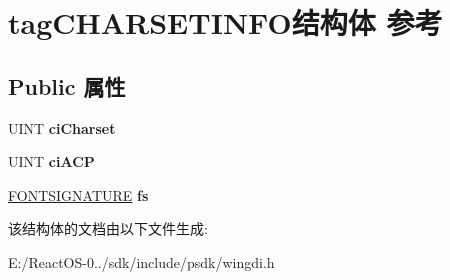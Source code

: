 \hypertarget{structtag_c_h_a_r_s_e_t_i_n_f_o}{}\section{tag\+C\+H\+A\+R\+S\+E\+T\+I\+N\+F\+O结构体 参考}
\label{structtag_c_h_a_r_s_e_t_i_n_f_o}
\subsection*{Public 属性}
\begin{DoxyCompactItemize}
\item 
\mbox{\label{structtag_c_h_a_r_s_e_t_i_n_f_o_aeda66ad5a4c3337cd65b2cf94e754c87}} 
U\+I\+NT {\bfseries ci\+Charset}
\item 
\mbox{\label{structtag_c_h_a_r_s_e_t_i_n_f_o_ab8201aa6825c7e74d9cd688f4029da51}} 
U\+I\+NT {\bfseries ci\+A\+CP}
\item 
\mbox{\label{structtag_c_h_a_r_s_e_t_i_n_f_o_a4e427827202d6de6a4fd2c5ce0cfef1a}} 
\hyperlink{structtag_f_o_n_t_s_i_g_n_a_t_u_r_e}{F\+O\+N\+T\+S\+I\+G\+N\+A\+T\+U\+RE} {\bfseries fs}
\end{DoxyCompactItemize}


该结构体的文档由以下文件生成\+:\begin{DoxyCompactItemize}
\item 
E\+:/\+React\+O\+S-\/0../sdk/include/psdk/wingdi.\+h\end{DoxyCompactItemize}
